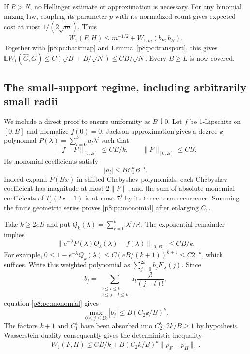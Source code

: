 \documentclass[11pt,a4paper]{article}
\theoremstyle{definition}
\theoremstyle{remark}
\numberwithin{equation}{section}
\begin{document}
If $B>N$, no Hellinger estimate or approximation is necessary.
For any binomial mixing law, coupling its parameter $p$ with its
normalized count gives expected cost at most $1/(2\sqrt m)$.
Thus
\[
 W_1(F,H)\le m^{-1/2}+W_{1,m}(b_F,b_H).
\]
Together with \eqref{p8:pc:backmap} and Lemma~\ref{p8:pc:transport}, this
gives $\mathbb E W_1(\widehat G,G)\le C(\sqrt B+B/\sqrt N)
\le CB/\sqrt N$.  Every $B\ge L$ is now covered.

\subsection{The small-support regime, including arbitrarily small radii}

We include a direct proof to ensure uniformity as $B\downarrow0$.
Let $f$ be 1-Lipschitz on $[0,B]$ and normalize $f(0)=0$.
Jackson approximation gives a degree-$k$ polynomial
$P(\lambda)=\sum_{l=0}^k a_l\lambda^l$ such that
\[
 \|f-P\|_{[0,B]}\le CB/k,\qquad \|P\|_{[0,B]}\le CB.
\]
Its monomial coefficients satisfy
\begin{equation}\label{p8:pc:monomial}
                         |a_l|\le BC_1^kB^{-l}.
\end{equation}
Indeed expand $P(Bx)$ in shifted Chebyshev polynomials: each
Chebyshev coefficient has magnitude at most $2\|P\|$, and the sum
of absolute monomial coefficients of $T_j(2x-1)$ is at most $7^j$
by its three-term recurrence.  Summing the finite geometric series
proves \eqref{p8:pc:monomial} after enlarging $C_1$.

Take $k\ge2eB$ and put $Q_k(\lambda)=\sum_{r=0}^k\lambda^r/r!$.
The exponential remainder implies
\[
 \|e^{-\lambda}P(\lambda)Q_k(\lambda)-f(\lambda)\|_{[0,B]}
                                                    \le CB/k.
\]
For example, $0\le1-e^{-\lambda}Q_k(\lambda)
\le C(eB/(k+1))^{k+1}\le C2^{-k}$, which suffices.
Write this weighted polynomial as $\sum_{j=0}^{2k}b_jK_\lambda(j)$.
Since
\[
 b_j=\sum_{\substack{0\le l\le k\\0\le j-l\le k}}
                      a_l\frac{j!}{(j-l)!},
\]
equation \eqref{p8:pc:monomial} gives
\begin{equation}\label{p8:pc:smallcoeff}
             \max_{0\le j\le2k}|b_j|\le B(C_2 k/B)^k.
\end{equation}
The factors $k+1$ and $C_1^k$ have been absorbed into $C_2^k$;
$2k/B\ge1$ by hypothesis.  Wasserstein duality consequently gives
the deterministic inequality
\begin{equation}\label{p8:pc:smallinverse}
 W_1(F,H)\le CB/k+
                B(C_2 k/B)^k\|p_F-p_H\|_1.
\end{equation}
\end{document}
